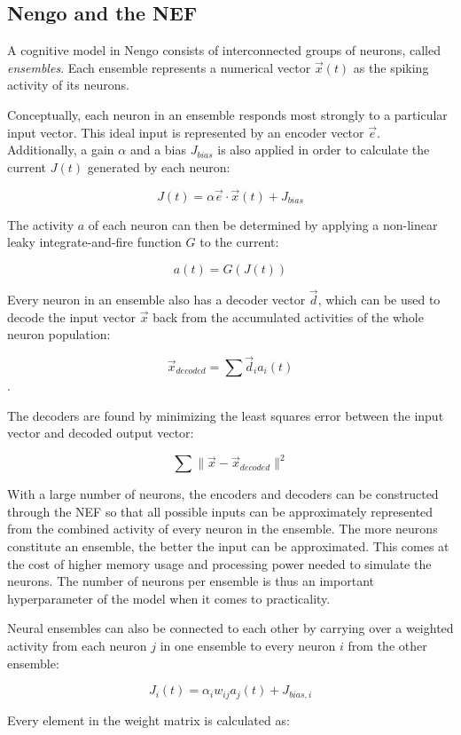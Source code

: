 \documentclass[10pt, a4paper, twocolumn]{article}
\begin{document}
\subsection{Nengo and the NEF}

A cognitive model in Nengo consists of interconnected groups of neurons, called \emph{ensembles}. Each ensemble represents a numerical vector $\vec{x}(t)$ as the spiking activity of its neurons.

Conceptually, each neuron in an ensemble responds most strongly to a particular input vector. This ideal input is represented by an encoder vector $\vec{e}$. Additionally, a gain $\alpha$ and a bias $J_{bias}$ is also applied in order to calculate the current $J(t)$ generated by each neuron:

$$J(t) = \alpha \vec{e} \cdot \vec{x}(t) + J_{bias}$$

The activity $a$ of each neuron can then be determined by applying a non-linear leaky integrate-and-fire function $G$ to the current:

$$a(t) = G(J(t))$$

Every neuron in an ensemble also has a decoder vector $\vec{d}$, which can be used to decode the input vector $\vec{x}$ back from the accumulated activities of the whole neuron population:

$$\vec{x}_{decoded} = \sum \vec{d}_i a_i(t)$$.

The decoders are found by minimizing the least squares error between the input vector and decoded output vector:

$$\sum \lVert \vec{x} - \vec{x}_{decoded} \rVert^2$$

With a large number of neurons, the encoders and decoders can be constructed through the NEF so that all possible inputs can be approximately represented from the combined activity of every neuron in the ensemble. The more neurons constitute an ensemble, the better the input can be approximated. This comes at the cost of higher memory usage and processing power needed to simulate the neurons. The number of neurons per ensemble is thus an important hyperparameter of the model when it comes to practicality.

Neural ensembles can also be connected to each other by carrying over a weighted activity from each neuron $j$ in one ensemble to every neuron $i$ from the other ensemble:

$$J_i(t) = \alpha_i w_{ij} a_j(t) + J_{bias,i}$$

Every element in the weight matrix is calculated as:
\end{document}
